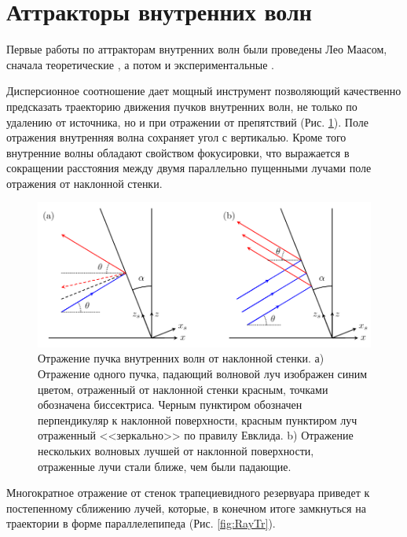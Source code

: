 
\section{Аттракторы внутренних волн}

Первые работы по аттракторам внутренних волн были проведены Лео Маасом, сначала теоретические \cite{Maas1995}, а потом и экспериментальные \cite{brouzet1997laboratory}.  

Дисперсионное соотношение дает мощный инструмент позволяющий качественно предсказать траекторию движения пучков внутренних волн, не только по удалению от источника, но и при отражении от препятствий (Рис. \ref{fig:internalReflection}). Поле отражения внутренняя волна сохраняет угол с вертикалью. Кроме того внутренние волны обладают свойством фокусировки, что выражается в сокращении расстояния между двумя параллельно пущенными лучами поле отражения от наклонной стенки. 

\begin{figure}
    \centering
    \includegraphics[scale=0.5]{Figs/angle_of_reflection.png}
    \caption{Отражение пучка внутренних волн от наклонной стенки. а) Отражение одного пучка, падающий волновой луч изображен синим цветом, отраженный от наклонной стенки красным, точками обозначена биссектриса. Черным пунктиром обозначен перпендикуляр к наклонной поверхности, красным пунктиром луч отраженный <<зеркально>> по правилу Евклида. b) Отражение нескольких волновых лучшей от наклонной поверхности, отраженные лучи стали ближе, чем были падающие.}
    \label{fig:internalReflection}
\end{figure}

Многократное отражение от стенок трапециевидного резервуара приведет к постепенному сближению лучей, которые, в конечном итоге замкнуться на траектории в форме параллелепипеда (Рис. \ref{fig:RayTr}). 

